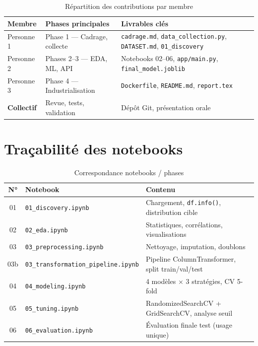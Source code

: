 \documentclass[11pt,a4paper,twoside,openright]{report}
\begin{document}
\begin{table}[H]
  \centering
  \caption{Répartition des contributions par membre}
  \label{tab:roles}
  \begin{tabularx}{\textwidth}{lXXX}
    \toprule
    \textbf{Membre} & \textbf{Phases principales} & \textbf{Livrables clés} \\
    \midrule
    Personne 1 & Phase 1 — Cadrage, collecte & \texttt{cadrage.md}, \texttt{data\_collection.py}, \texttt{DATASET.md}, \texttt{01\_discovery} \\
    Personne 2 & Phases 2–3 — EDA, ML, API & Notebooks 02–06, \texttt{app/main.py}, \texttt{final\_model.joblib} \\
    Personne 3 & Phase 4 — Industrialisation & \texttt{Dockerfile}, \texttt{README.md}, \texttt{report.tex} \\
    \midrule
    \textbf{Collectif} & Revue, tests, validation & Dépôt Git, présentation orale \\
    \bottomrule
  \end{tabularx}
\end{table}

\section*{Traçabilité des notebooks}

\begin{table}[H]
  \centering
  \caption{Correspondance notebooks / phases}
  \label{tab:notebooks}
  \small
  \begin{tabular}{clp{7.5cm}}
    \toprule
    \textbf{N°} & \textbf{Notebook} & \textbf{Contenu} \\
    \midrule
    01 & \texttt{01\_discovery.ipynb} & Chargement, \texttt{df.info()}, distribution cible \\
    02 & \texttt{02\_eda.ipynb} & Statistiques, corrélations, visualisations \\
    03 & \texttt{03\_preprocessing.ipynb} & Nettoyage, imputation, doublons \\
    03b & \texttt{03\_transformation\_pipeline.ipynb} & Pipeline ColumnTransformer, split train/val/test \\
    04 & \texttt{04\_modeling.ipynb} & 4 modèles $\times$ 3 stratégies, CV 5-fold \\
    05 & \texttt{05\_tuning.ipynb} & RandomizedSearchCV + GridSearchCV, analyse seuil \\
    06 & \texttt{06\_evaluation.ipynb} & Évaluation finale test (usage unique) \\
    \bottomrule
  \end{tabular}
\end{table}
\end{document}
